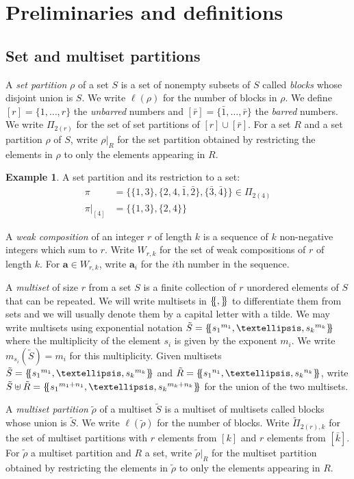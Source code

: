 \documentclass[10pt]{amsart}
\theoremstyle{definition}
\theoremstyle{definition}
\newtheorem{exam}[exam]{Example}
\theoremstyle{plain}
\theoremstyle{remark}
\theoremstyle{plain}
\theoremstyle{plain}
\newcommand{\bfa}{{\boldsymbol{a}}}
\newcommand{\trho}{{\tilde{\rho}}}
\newcommand{\tS}{{\tilde{S}}}
\newcommand{\tR}{{\tilde{R}}}
\newcommand{\multi}[1]{\left\{\mskip-5mu\left\{#1\right\}\mskip-5mu\right\}}
\newcommand{\ov}[1]{\bar{#1}}
\newcommand{\ovb}[1]{\left[\ov{#1}\right]}
\newcommand{\defn}[1]{\textcolor{defncolor}{\emph{#1}}}
\begin{document}
\section{Preliminaries and definitions}\label{sec:prelim}

\subsection{Set and multiset partitions}

A \defn{set partition} $\rho$ of a set $S$ is a set of nonempty subsets of $S$ called \defn{blocks} whose disjoint union is $S$. We write $\ell(\rho)$ for the number of blocks in $\rho$. We define $[r]=\{1,\dots,r\}$ the \defn{unbarred} numbers and $\ovb{r}=\{\ov1,\dots,\ov r\}$ the \defn{barred} numbers. We write $\Pi_{2(r)}$ for the set of set partitions of $[r]\cup\ovb{r}$. For a set $R$ and a set partition $\rho$ of $S$, write $\rho|_R$ for the set partition obtained by restricting the elements in $\rho$ to only the elements appearing in $R$.

\begin{exam} A set partition and its restriction to a set:
    \begin{align*}
        \pi&=\{\{1,3\},\{2,4,\ov1,\ov2\},\{\ov3,\ov4\}\}\in\Pi_{2(4)}\\
        \pi|_{[4]}&=\{\{1,3\},\{2,4\}\}
    \end{align*}
\end{exam}

A \defn{weak composition} of an integer $r$ of length $k$ is a sequence of $k$ non-negative integers which sum to $r$. Write $W_{r,k}$ for the set of weak compositions of $r$ of length $k$. For $\bfa\in W_{r,k}$, write $\bfa_i$ for the $i$th number in the sequence.

A \defn{multiset} of size $r$ from a set $S$ is a finite collection of $r$ unordered elements of $S$ that can be repeated. We will write multisets in $\multi{,}$ to differentiate them from sets and we will usually denote them by a capital letter with a tilde. We may write multisets using exponential notation $\tS=\multi{{s_1}^{m_1},\dots,{s_k}^{m_k}}$ where the multiplicity of the element $s_i$ is given by the exponent $m_i$. We write $m_{s_i}(\tS)=m_i$ for this multiplicity. Given multisets $\tS=\multi{{s_1}^{m_1},\dots,{s_k}^{m_k}}$ and $\tR=\multi{{s_1}^{n_1},\dots,{s_k}^{n_k}}$, write $\tS\uplus\tR=\multi{{s_1}^{m_1+n_1},\dots,{s_k}^{m_k+n_k}}$ for the union of the two multisets.

A \defn{multiset partition} $\tilde\rho$ of a multiset $\tS$ is a multiset of multisets called blocks whose union is $\tS$. We write $\ell(\tilde\rho)$ for the number of blocks. Write $\tilde\Pi_{2(r),k}$ for the set of multiset partitions with $r$ elements from $[k]$ and $r$ elements from $\ovb{k}$. For $\trho$ a multiset partition and $R$ a set, write $\trho|_{R}$ for the multiset partition obtained by restricting the elements in $\trho$ to only the elements appearing in $R$. 
\end{document}
